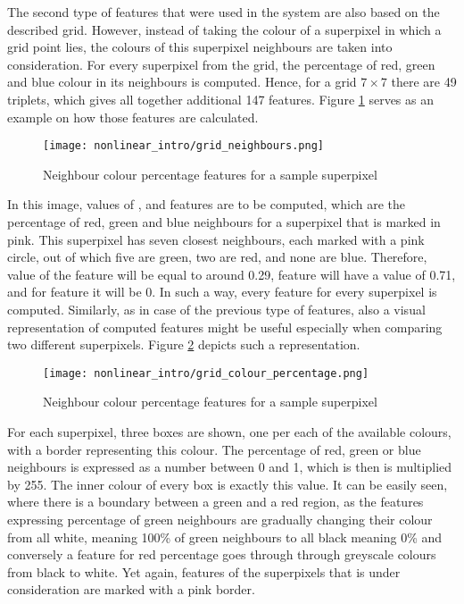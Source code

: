 The second type of features that were used in the system are also based on the described grid. However, instead of taking the colour of a superpixel in which a grid point lies, the colours of this superpixel neighbours are taken into consideration. For every superpixel from the grid, the percentage of red, green and blue colour in its neighbours is computed. Hence, for a grid $7 \times 7$ there are 49 triplets, which gives all together additional 147 features. Figure \ref{fig:grid_colour_neighbour} serves as an example on how those features are calculated.
\begin{figure}[ht]
    \centering
    \texttt{[image: nonlinear\_intro/grid\_neighbours.png]}
    \caption{Neighbour colour percentage features for a sample superpixel}
    \label{fig:grid_colour_neighbour}
\end{figure}
In this image, values of ,  and  features are to be computed, which are the percentage of red, green and blue neighbours for a superpixel that is marked in pink. This superpixel has seven closest neighbours, each marked with a pink circle, out of which five are green, two are red, and none are blue. Therefore, value of the  feature will be equal to around 0.29,  feature will have a value of 0.71, and for  feature it will be 0. In such a way, every feature for every superpixel is computed. Similarly, as in case of the previous type of features, also a visual representation of computed features might be useful especially when comparing two different superpixels. Figure \ref{fig:grid_colour_neighbour_percentage} depicts such a representation. 
\begin{figure}[ht]
    \centering
    \texttt{[image: nonlinear\_intro/grid\_colour\_percentage.png]}
    \caption{Neighbour colour percentage features for a sample superpixel}
    \label{fig:grid_colour_neighbour_percentage}
\end{figure}
For each superpixel, three boxes are shown, one per each of the available colours, with a border representing this colour. The percentage of red, green or blue neighbours is expressed as a number between 0 and 1, which is then is multiplied by 255. The inner colour of every box is exactly this value. It can be easily seen, where there is a boundary between a green and a red region, as the features expressing percentage of green neighbours are gradually changing their colour from all white, meaning 100\% of green neighbours to all black meaning 0\% and conversely a feature for red percentage goes through through greyscale colours from black to white. Yet again, features of the superpixels that is under consideration are marked with a pink border.

